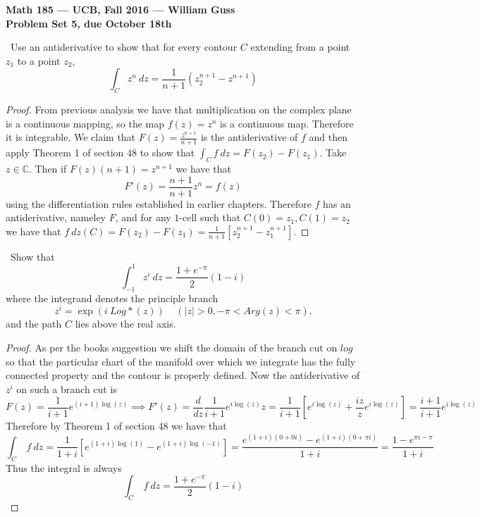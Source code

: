 \documentclass[11pt]{amsart}
\theoremstyle{definition}
\numberwithin{theorem}{section}
\numberwithin{definition}{section}
\numberwithin{equation}{section}
\begin{document}
\begin{center}{\bf Math 185 --- UCB, Fall 2016 --- William Guss}
\\
{\bf Problem Set 5, due October 18th}
\end{center}

\medskip {}\ Use an antiderivative to show that for every contour $C$ extending from a point
$z_1$ to a point $z_2$,
\begin{equation*}
	\int_Cz^n\ dz = \frac{1}{n+1}(z^{n+1}_2 - z^{n+1})
\end{equation*}
\begin{proof}
	From previous analysis we have that multiplication on the complex plane is a continuous mapping, so the map $f(z) = z^n$
	is a continuous map. Therefore it is integrable. We claim that $F(z) = \frac{z^{n+1}}{n+1}$ is the antiderivative of $f$
	and then apply Theorem 1 of section 48 to show that $\int_C f\ dz = F(z_2) - F(z_1).$ 
	Take $z \in \mathbb{C}$. Then if $F(z)(n+1) = z^{n+1}$ we have that
	\begin{equation*}
		F'(z) = \frac{n+1}{n+1} z^n = f(z) 
	\end{equation*}
	using the differentiation rules established in earlier chapters. Therefore $f$ has an antiderivative, nameley $F$, and
	for any $1$-cell such that $C(0) = z_1, C(1) = z_2$ we have that $f\ dz(C) = F(z_2) - F(z_1) = \frac{1}{n+1}\left[z^{n+1}_2 - z^{n+1}_1\right].$
\end{proof}

\medskip {}\ Show that 
\begin{equation*}
	\int_{-1}^1 z^i\ dz = \frac{1+e^{-\pi}}{2}(1-i)
\end{equation*}
where the integrand denotes the principle branch
\begin{equation*}
	z^i = \exp(i\ Log*(z))\;\;\;\;(|z|>0, -\pi < Arg(z) < \pi).
\end{equation*}
and the path $C$ lies above the real axis.
\begin{proof}
	As per the books suggestion we shift the domain of the branch cut on $log$ so that the particular chart of the manifold
	over which we integrate has the fully connected property and the contour is properly defined. Now the antiderivative of $z^i$ on such a branch cut is
	\begin{equation*}
		F(z) = \frac{1}{i+1}e^{(i+1)\log(z)} \implies F'(z) = \frac{d}{dz}\frac{1}{i+1}e^{i \log(z)}z = \frac{1}{i+1}\left[e^{i \log(z)} + \frac{iz}{z} e^{i\log(z)}\right] = \frac{i+1}{i+1}e^{i \log(z)}
	\end{equation*}
	Therefore by Theorem 1 of section 48 we have that
	\begin{equation*}
		\int_C\ f\ dz = \frac{1}{1+i} \left[e^{(1+i)\log(1)} - e^{(1+i)\log(-1)}\right] = \frac{e^{(1+i)(0+0i)} -e^{(1+i)(0 + \pi i)}}{1+i} = \frac{1 - e^{\pi i - \pi}}{1 + i}
	\end{equation*}
	Thus the integral is always
	\begin{equation*}
		\int_C\ f\ dz = \frac{1+e^{-\pi}}{2}(1-i)
	\end{equation*}
\end{proof}
\end{document}
